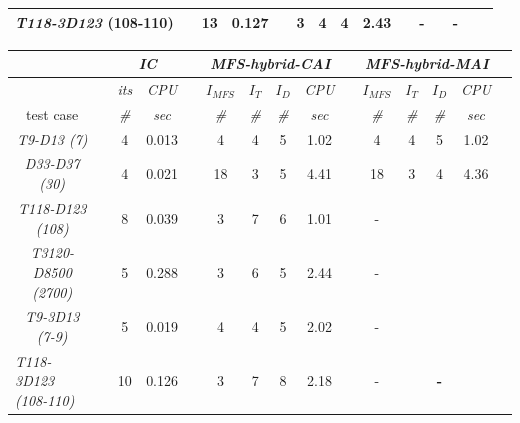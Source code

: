 \documentclass[10pt,journal]{article}
\begin{document}
\begin{table}[h!]
\begin{adjustbox}{width=\textwidth}
\begin{tabular}{@{}l c cc c  cccc c cccc c  @{}}
 \multicolumn{1}{l}{\textit{T118-3D123} (108-110)}          && 13 & {0.127}    && 3  & 4 & 4 &  \textbf{2.43} && -  &  & \textbf{-} \\
\toprule 
\end{tabular}
\end{adjustbox}
\begin{adjustbox}{width=1\textwidth} %
\small
\begin{tabular}{@{}l c cc c  cccc c cccc c  @{}}\toprule
                               && \multicolumn{2}{c}{\textit{IC}} &&     \multicolumn{4}{c}{\textit{MFS-hybrid-CAI}} && \multicolumn{4}{c}{\textit{MFS-hybrid-MAI}} \\ \midrule 
\multicolumn{1}{l}{}        && \textit{its}      & \textit{CPU} && $I_{MFS}$      & $I_T$   &  $I_D$      & \textit{CPU}     &&$I_{MFS}$      & $I_T$   &  $I_D$      & \textit{CPU}      \\
\cmidrule{3-4}  \cmidrule{6-9}  \cmidrule{11-14}   
\multicolumn{1}{c}{test case}      && \textit{\#}       & \textit{sec} && \textit{\#}      & \textit{\#}    & \textit{\#}       & \textit{sec}     && \textit{\#}        & \textit{\#}     &  \textit{\#}       & \textit{sec}  \\
\midrule
\multicolumn{1}{c}{\textit{T9-D13 (7)}}           && 4  & {0.013}    && 4  & 4 & 5 &  1.02 && 4  & 4 & 5 & {1.02}\\
\multicolumn{1}{c}{\textit{D33-D37 (30)}}         && 4  & {0.021}    && 18 & 3 & 5 &  4.41 && 18  & 3 &  4 & {4.36}\\
\multicolumn{1}{c}{{\textit{T118-D123 (108)}}}    && 8  & {0.039}    && 3  & 7 & 6 &  1.01 && -  &  &  &    \\
\multicolumn{1}{c}{{\textit{T3120-D8500 (2700)}}} && 5  & {0.288}    && 3  & 6 & 5 &  2.44 && -  &  &  &  \\
\multicolumn{1}{c}{{\textit{T9-3D13 (7-9)}}}      && 5  & {0.019}    && 4  & 4 & 5 &  2.02 && -  &  &  &      \\
 \multicolumn{1}{l}{\textit{T118-3D123 (108-110)}}          && 10 & 0.126    && 3  & 7 & 8 &  2.18 && -  &  & \textbf{-} \\
\toprule 
\end{tabular}
\end{adjustbox}
\end{table}
\end{document}
